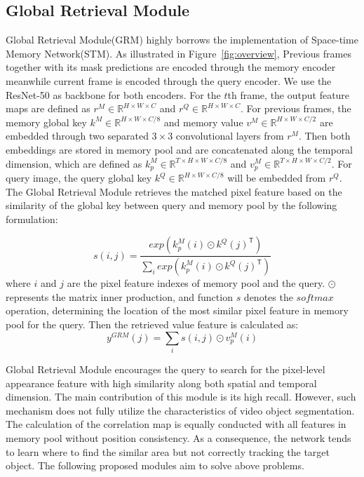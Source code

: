 \documentclass[final]{cvpr}
\begin{document}
\subsection{Global Retrieval Module}\label{sec:GRM}
Global Retrieval Module(GRM) highly borrows the implementation of Space-time Memory Network(STM)\cite{STM}. As illustrated in Figure~\ref{fig:overview}, Previous frames together with its mask predictions are encoded through the memory encoder meanwhile current frame is encoded through the query encoder. We use the ResNet-50\cite{resnet} as backbone for both encoders. For the $t$th frame, the output feature maps are defined as $r^{M}{\in}{\mathbb{R}}^{H{\times}W{\times}C}$ and $r^{Q}{\in}{\mathbb{R}}^{H{\times}W{\times}C}$. 
For previous frames,
the memory global key $k^{M}{\in}{\mathbb{R}}^{H{\times}W{\times}C/8}$ and memory value $v^{M}{\in}{\mathbb{R}}^{H{\times}W{\times}C/2}$ are embedded through two separated $3{\times}3$ convolutional layers from $r^{M}$. Then both embeddings are stored in memory pool and are concatenated along the temporal dimension, which are defined as $k^{M}_{p}{\in}{\mathbb{R}}^{T{\times}H{\times}W{\times}C/8}$ and $v^{M}_{p}{\in}{\mathbb{R}}^{T{\times}H{\times}W{\times}C/2}$. For query image, the query global key $k^{Q}{\in}{\mathbb{R}}^{H{\times}W{\times}C/8}$ will be embedded from $r^{Q}$. The Global Retrieval Module retrieves the matched pixel feature based on the similarity of the global key between query and memory pool by the following formulation:

\begin{equation}
s(i,j)=\frac{exp(k^{M}_{p}(i){\odot}{k^{Q}(j)^\mathsf{T}})}{\sum_{i}exp(k^{M}_{p}(i){\odot}{k^{Q}(j)^\mathsf{T}})}
\end{equation}
where $i$ and $j$ are the pixel feature indexes of memory pool and the query. $\odot$ represents the matrix inner production, and function $s$ denotes the $softmax$ operation, determining the location of the most similar pixel feature in memory pool for the query. Then the retrieved value feature is calculated as:
\begin{equation}
y^{GRM}(j)=\sum_{i}s(i,j){\odot}v^{M}_{p}(i)
\end{equation}

Global Retrieval Module encourages the query to search for the pixel-level appearance feature with high similarity along both spatial and temporal dimension. The main contribution of this module is its high recall. However, such mechanism does not fully utilize the characteristics of video object segmentation. The calculation of the correlation map is equally conducted with all features in memory pool without position consistency. As a consequence, the network tends to learn where to find the similar area but not correctly tracking the target object. The following proposed modules aim to solve above problems.
\end{document}
